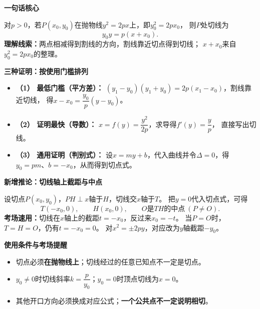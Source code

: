 \begin{summarybox}
    \textbf{\textcolor{CSummary}{一句话核心}}

    对$p>0$，若$P(x_0,y_0)$在抛物线$y^2=2px$上，即$y_0^2=2px_0$，
    则$P$处切线为
    \[
        \boxed{y_0y=p(x+x_0)}.
    \]
    \textbf{理解线索：}两点相减得到割线的方向，割线靠近切点得到切线；
    $x+x_0$来自$y_0^2=2px_0$的整理。

    \medskip
    \textbf{\textcolor{CSummary}{三种证明：按使用门槛排列}}
    \begin{itemize}[leftmargin=*, itemsep=0.4em, topsep=0.3em]
        \item \textbf{（1） 最低门槛（平方差）：}
        $(y_1-y_0)(y_1+y_0)=2p(x_1-x_0)$，割线靠近切线，
        得$x-x_0=\dfrac{y_0}{p}(y-y_0)$。
        \item \textbf{（2） 证明最快（导数）：}
        $x=f(y)=\dfrac{y^2}{2p}$，求导得$f'(y)=\dfrac{y}{p}$，
        直接写出切线。
        \item \textbf{（3） 通用证明（判别式）：}
        设$x=my+b$，代入曲线并令$\Delta=0$，得
        $y_0=pm$、$b=-x_0$，从而得到切点式。
    \end{itemize}

    \medskip
    \textbf{\textcolor{CSummary}{新增推论：切线轴上截距与中点}}

    设切点$P(x_0,y_0)$，$PH\perp x$轴于$H$，切线交$x$轴于$T$。
    把$y=0$代入切点式，可得
    \[
      \boxed{T(-x_0,0)},\qquad H(x_0,0),\qquad
      \boxed{O\text{是}TH\text{的中点}\ (P\ne O)}.
    \]
    \textbf{考场速用：}切线在$x$轴上的截距$t=-x_0$，反过来$x_0=-t$。
    当$P=O$时，$T=H=O$，仍有$t=-x_0=0$。
    对$x^2=\pm2py$，对应改为$y$轴截距$-y_0$。

    \medskip
    \textbf{\textcolor{CSummary}{使用条件与考场提醒}}
    \begin{itemize}[leftmargin=*, itemsep=0.4em, topsep=0.3em]
        \item 切点必须\textbf{在抛物线上}；切线经过的任意已知点不一定是切点。
        \item $y_0\ne0$时切线斜率$k=\dfrac{p}{y_0}$；$y_0=0$时顶点切线为$x=0$。
        \item 其他开口方向必须换成对应公式；\textbf{一个公共点不一定说明相切}。
    \end{itemize}
\end{summarybox}
